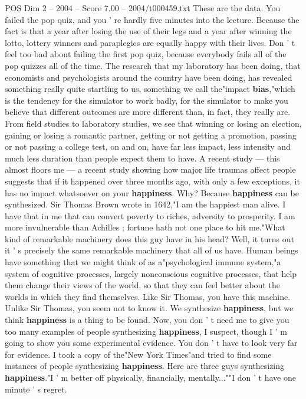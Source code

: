 \begin{textsample}{POS Dim 2 – 2004 – Score 7.00 – 2004/t000459.txt}
These are the data.
You failed the pop quiz, and you ' re hardly five minutes into the lecture.
Because the fact is that a year after losing the use of their legs and a year after winning the lotto, lottery winners and paraplegics are equally happy with their lives.
Don ' t feel too bad about failing the first pop quiz, because everybody fails all of the pop quizzes all of the time.
The research that my laboratory has been doing, that economists and psychologists around the country have been doing, has revealed something really quite startling to us, something we call the"impact \textbf{bias},"which is the tendency for the simulator to work badly, for the simulator to make you believe that different outcomes are more different than, in fact, they really are.
From field studies to laboratory studies, we see that winning or losing an election, gaining or losing a romantic partner, getting or not getting a promotion, passing or not passing a college test, on and on, have far less impact, less intensity and much less duration than people expect them to have.
A recent study — this almost floors me — a recent study showing how major life traumas affect people suggests that if it happened over three months ago, with only a few exceptions, it has no impact whatsoever on your \textbf{happiness}.
Why?
Because \textbf{happiness} can be synthesized.
Sir Thomas Brown wrote in 1642,"I am the happiest man alive.
I have that in me that can convert poverty to riches, adversity to prosperity.
I am more invulnerable than Achilles ; fortune hath not one place to hit me."What kind of remarkable machinery does this guy have in his head?
Well, it turns out it ' s precisely the same remarkable machinery that all of us have.
Human beings have something that we might think of as a"psychological immune system,"a system of cognitive processes, largely nonconscious cognitive processes, that help them change their views of the world, so that they can feel better about the worlds in which they find themselves.
Like Sir Thomas, you have this machine.
Unlike Sir Thomas, you seem not to know it.
We synthesize \textbf{happiness}, but we think \textbf{happiness} is a thing to be found.
Now, you don ' t need me to give you too many examples of people synthesizing \textbf{happiness}, I suspect, though I ' m going to show you some experimental evidence.
You don ' t have to look very far for evidence.
I took a copy of the"New York Times"and tried to find some instances of people synthesizing \textbf{happiness}.
Here are three guys synthesizing \textbf{happiness}."I ' m better off physically, financially, mentally...""I don ' t have one minute ' s regret.

\end{textsample}
